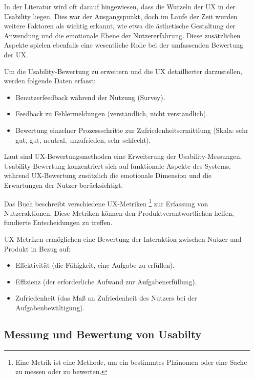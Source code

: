 \documentclass[12pt,oneside]{article}
\begin{document}
In der Literatur wird oft darauf hingewiesen, dass die Wurzeln der UX in der Usability liegen. Dies war der Ausgangspunkt, doch im Laufe der Zeit wurden weitere Faktoren als wichtig erkannt, wie etwa die ästhetische Gestaltung der Anwendung und die emotionale Ebene der Nutzererfahrung. Diese zusätzlichen Aspekte spielen ebenfalls eine wesentliche Rolle bei der umfassenden Bewertung der UX.
 
Um die Usability-Bewertung zu erweitern und die UX detaillierter darzustellen, werden folgende Daten erfasst:

\begin{itemize} \item Benutzerfeedback während der Nutzung (Survey). \item Feedback zu Fehlermeldungen (verständlich, nicht verständlich). \item Bewertung einzelner Prozessschritte zur Zufriedenheitsermittlung (Skala: sehr gut, gut, neutral, unzufrieden, sehr schlecht). \end{itemize}

Laut \cite{GOISTAI} sind UX-Bewertungsmethoden eine Erweiterung der Usability-Messungen. Usability-Bewertung konzentriert sich auf funktionale Aspekte des Systems, während UX-Bewertung zusätzlich die emotionale Dimension und die Erwartungen der Nutzer berücksichtigt.

Das Buch \cite{measuring} beschreibt verschiedene UX-Metriken \footnote{Eine Metrik ist eine Methode, um ein bestimmtes Phänomen oder eine Sache zu messen oder zu bewerten.} zur Erfassung von Nutzeraktionen. Diese Metriken können den Produktverantwortlichen helfen, fundierte Entscheidungen zu treffen.

UX-Metriken ermöglichen eine Bewertung der Interaktion zwischen Nutzer und Produkt in Bezug auf:

\begin{itemize} \item Effektivität (die Fähigkeit, eine Aufgabe zu erfüllen). \item Effizienz (der erforderliche Aufwand zur Aufgabenerfüllung). \item Zufriedenheit (das Maß an Zufriedenheit des Nutzers bei der Aufgabenbewältigung). \end{itemize}


 

\subsection{Messung und Bewertung von Usabilty}
\end{document}
